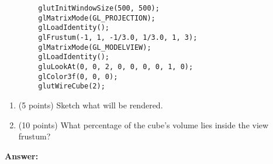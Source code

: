 \documentclass[13pt]{letter}
\begin{document}
\begin{enumerate}
	\begin{verbatim}
		glutInitWindowSize(500, 500);
		glMatrixMode(GL_PROJECTION);
		glLoadIdentity();
		glFrustum(-1, 1, -1/3.0, 1/3.0, 1, 3);
		glMatrixMode(GL_MODELVIEW);
		glLoadIdentity();
		gluLookAt(0, 0, 2, 0, 0, 0, 0, 1, 0);
		glColor3f(0, 0, 0);
		glutWireCube(2);
	\end{verbatim}
	\begin{enumerate}
		\item (5 points)
		Sketch what will be rendered.

		\item (10 points) 
		What percentage of the cube’s volume lies inside the view frustum?
	
	\end{enumerate}
	
	\textbf{Answer:} \\
	\vspace{288pt}

\end{enumerate}
\end{document}
